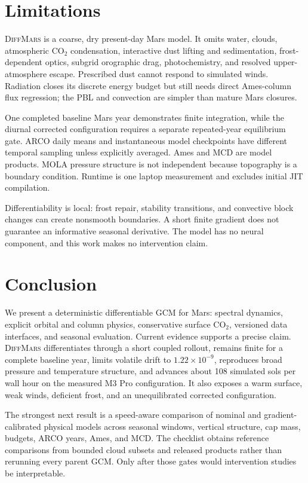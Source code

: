 \documentclass{article}
\newcommand{\model}{\textsc{DiffMars}}
\begin{document}
\section{Limitations}
\model{} is a coarse, dry present-day Mars model. It omits water, clouds,
atmospheric \(\mathrm{CO_2}\) condensation, interactive dust lifting and
sedimentation, frost-dependent optics, subgrid orographic drag, photochemistry,
and resolved upper-atmosphere escape. Prescribed dust cannot respond to simulated
winds. Radiation closes its discrete energy budget but still needs direct
Ames-column flux regression; the PBL and convection are simpler than mature
Mars closures.

One completed baseline Mars year demonstrates finite integration, while the
diurnal corrected configuration requires a separate repeated-year equilibrium
gate. ARCO daily means and instantaneous model checkpoints have different
temporal sampling unless explicitly averaged. Ames and MCD are model products.
MOLA pressure structure is
not independent because topography is a boundary condition. Runtime is one
laptop measurement and excludes initial JIT compilation.

Differentiability is local: frost repair, stability transitions, and convective
block changes can create nonsmooth boundaries. A short finite gradient does not
guarantee an informative seasonal derivative. The model has no neural
component, and this work makes no intervention claim.

\section{Conclusion}
We present a deterministic differentiable GCM for Mars: spectral
dynamics, explicit orbital and column physics, conservative surface
\(\mathrm{CO_2}\), versioned data interfaces, and seasonal evaluation. Current
evidence supports a precise claim. \model{} differentiates through a short
coupled rollout, remains finite for a complete baseline year, limits volatile
drift to \(1.22\times10^{-9}\), reproduces broad pressure and temperature
structure, and advances about 108 simulated sols per wall hour on the measured
M3 Pro configuration. It also exposes a warm surface, weak winds, deficient
frost, and an unequilibrated corrected configuration.

The strongest next result is a speed-aware comparison of nominal and
gradient-calibrated physical models across seasonal windows, vertical structure,
cap mass, budgets, ARCO years, Ames, and MCD. The checklist obtains reference
comparisons from bounded cloud subsets and released products rather than
rerunning every parent GCM. Only after those gates would intervention studies be
interpretable.
\end{document}
